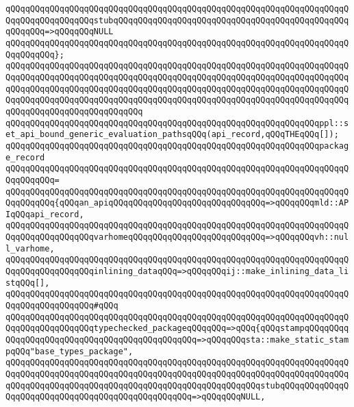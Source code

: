 \verb|qQQqqQQqqQQqqQQqqQQqqQQqqQQqqQQqqQQqqQQqqQQqqQQqqQQqqQQqqQQqqQQqqQQqqQQqqQQqqQQqqQQqqQQqstubqQQqqQQqqQQqqQQqqQQqqQQqqQQqqQQqqQQqqQQqqQQqqQQqqQQqqQQq=>qQQqqQQqNULL|\newline
\verb|qQQqqQQqqQQqqQQqqQQqqQQqqQQqqQQqqQQqqQQqqQQqqQQqqQQqqQQqqQQqqQQqqQQqqQQqqQQqqQQq};|\newline
\newline
\verb|qQQqqQQqqQQqqQQqqQQqqQQqqQQqqQQqqQQqqQQqqQQqqQQqqQQqqQQqqQQqqQQqqQQqqQQqqQQqqQQqqQQqqQQqqQQqqQQqqQQqqQQqqQQqqQQqqQQqqQQqqQQqqQQqqQQqqQQqqQQqqQQqqQQqqQQqqQQqqQQqqQQqqQQqqQQqqQQqqQQqqQQqqQQqqQQqqQQqqQQqqQQqqQQqqQQqqQQqqQQqqQQqqQQqqQQqqQQqqQQqqQQqqQQqqQQqqQQqqQQqqQQqqQQqqQQqqQQqqQQqqQQqqQQqqQQqqQQqqQQqqQQqqQQq|\newline
\verb|qQQqqQQqqQQqqQQqqQQqqQQqqQQqqQQqqQQqqQQqqQQqqQQqqQQqqQQqqQQqqQQqppl::set_api_bound_generic_evaluation_pathsqQQq(api_record,qQQqTHEqQQq[]);|\newline
\newline
\verb|qQQqqQQqqQQqqQQqqQQqqQQqqQQqqQQqqQQqqQQqqQQqqQQqqQQqqQQqqQQqqQQqpackage_record|\newline
\verb|qQQqqQQqqQQqqQQqqQQqqQQqqQQqqQQqqQQqqQQqqQQqqQQqqQQqqQQqqQQqqQQqqQQqqQQqqQQqqQQq=|\newline
\verb|qQQqqQQqqQQqqQQqqQQqqQQqqQQqqQQqqQQqqQQqqQQqqQQqqQQqqQQqqQQqqQQqqQQqqQQqqQQqqQQq{qQQqan_apiqQQqqQQqqQQqqQQqqQQqqQQqqQQqqQQq=>qQQqqQQqmld::APIqQQqapi_record,|\newline
\verb|qQQqqQQqqQQqqQQqqQQqqQQqqQQqqQQqqQQqqQQqqQQqqQQqqQQqqQQqqQQqqQQqqQQqqQQqqQQqqQQqqQQqqQQqvarhomeqQQqqQQqqQQqqQQqqQQqqQQqqQQq=>qQQqqQQqvh::null_varhome,|\newline
\verb|qQQqqQQqqQQqqQQqqQQqqQQqqQQqqQQqqQQqqQQqqQQqqQQqqQQqqQQqqQQqqQQqqQQqqQQqqQQqqQQqqQQqqQQqinlining_dataqQQq=>qQQqqQQqij::make_inlining_data_listqQQq[],|\newline
\verb|qQQqqQQqqQQqqQQqqQQqqQQqqQQqqQQqqQQqqQQqqQQqqQQqqQQqqQQqqQQqqQQqqQQqqQQqqQQqqQQqqQQqqQQq#qQQq|\newline
\verb|qQQqqQQqqQQqqQQqqQQqqQQqqQQqqQQqqQQqqQQqqQQqqQQqqQQqqQQqqQQqqQQqqQQqqQQqqQQqqQQqqQQqqQQqtypechecked_packageqQQqqQQq=>qQQq{qQQqstampqQQqqQQqqQQqqQQqqQQqqQQqqQQqqQQqqQQqqQQqqQQqqQQq=>qQQqqQQqsta::make_static_stampqQQq"base_types_package",|\newline
\verb|qQQqqQQqqQQqqQQqqQQqqQQqqQQqqQQqqQQqqQQqqQQqqQQqqQQqqQQqqQQqqQQqqQQqqQQqqQQqqQQqqQQqqQQqqQQqqQQqqQQqqQQqqQQqqQQqqQQqqQQqqQQqqQQqqQQqqQQqqQQqqQQqqQQqqQQqqQQqqQQqqQQqqQQqqQQqqQQqqQQqqQQqqQQqqQQqstubqQQqqQQqqQQqqQQqqQQqqQQqqQQqqQQqqQQqqQQqqQQqqQQqqQQq=>qQQqqQQqNULL,|\newline
